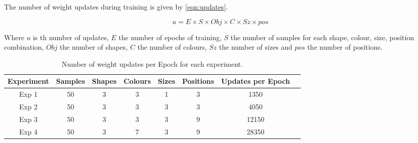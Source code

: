 


The number of weight updates during training is given by \autoref{eqn:updates}.

\begin{equation}\label{eqn:updates}
u = E \times S \times Obj \times C \times Sz \times pos
\end{equation}

Where $u$ is th number of updates, $E$ the number of epochs of training, $S$ the number of samples for each shape, colour, size, position combination, $Obj$ the number of shapes, $C$ the number of colours, $Sz$ the number of sizes and $pos$ the number of positions.


\begin{table}
\centering
\begin{tabular}{|c|c|c|c|c|c|c|c|}
\hline
Experiment & Samples & Shapes & Colours & Sizes & Positions & Updates per Epoch \\ \hline
Exp 1 & 50 & 3 & 3 & 1 & 3 & 1350 \\ \hline
Exp 2 & 50 & 3 & 3 & 3 & 3 & 4050 \\ \hline
Exp 3 & 50 & 3 & 3 & 3 & 9 & 12150 \\ \hline
Exp 4 & 50 & 3 & 7 & 3 & 9 & 28350 \\ \hline

\end{tabular}
\caption{Number of weight updates per Epoch for each experiment.}
\label{tab:updatesperEpoch}
\end{table}

